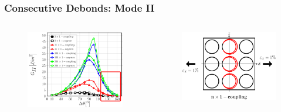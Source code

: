 \documentclass[first,firstsupp,lastsupp,last,hyperref,table]{ETHclass}
\begin{document}
\begin{frame}
\frametitle{\vspace{0.2cm}\small Consecutive Debonds: Mode II}
\vspace{-0.5cm}
\centering
\begin{columns}
\centering
\begin{column}{0.65\textwidth}
\centering
\begin{figure}
\centering
\includegraphics[width=\columnwidth]{nx1-coupling-vf60-GII-dtheta150.pdf}
\end{figure}
\end{column}
\begin{column}{0.35\textwidth}
\centering
\begin{figure}
\centering
\includegraphics[width=\columnwidth]{twofibers-sameside-dtheta150.pdf}

\end{figure}
\end{column}
\end{columns}
\end{frame}
\end{document}

